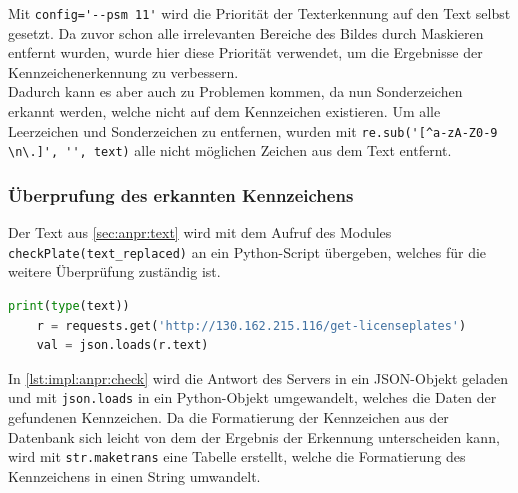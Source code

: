 Mit \verb|config='--psm 11'| wird die Priorität der Texterkennung auf den Text selbst gesetzt. Da zuvor schon alle irrelevanten Bereiche des Bildes durch Maskieren entfernt wurden, wurde hier diese Priorität verwendet, um die Ergebnisse der Kennzeichenerkennung zu verbessern. \cite{PSM11} \\
Dadurch kann es aber auch zu Problemen kommen, da nun Sonderzeichen erkannt werden, welche nicht auf dem Kennzeichen existieren. Um alle Leerzeichen und Sonderzeichen zu entfernen, wurden mit \verb|re.sub('[^a-zA-Z0-9 \n\.]', '', text)| alle nicht möglichen Zeichen aus dem Text entfernt.


\subsubsection{Überprufung des erkannten Kennzeichens}
Der Text aus \ref{sec:anpr:text} wird mit dem Aufruf des Modules \verb|checkPlate(text_replaced)| an ein Python-Script übergeben, welches für die weitere Überprüfung zuständig ist.

\begin{lstlisting}[language=Python, caption=Abfrage der Kennzeichen aus der Datenbank, label=lst:impl:anpr:check]
    print(type(text))
    r = requests.get('http://130.162.215.116/get-licenseplates')
    val = json.loads(r.text)
\end{lstlisting}

In \ref{lst:impl:anpr:check} wird die Antwort des Servers in ein JSON-Objekt geladen und mit \verb|json.loads| in ein Python-Objekt umgewandelt, welches die Daten der gefundenen Kennzeichen. Da die Formatierung der Kennzeichen aus der Datenbank sich leicht von dem der Ergebnis der Erkennung unterscheiden kann, wird mit \verb|str.maketrans| eine Tabelle erstellt, welche die Formatierung des Kennzeichens in einen String umwandelt.